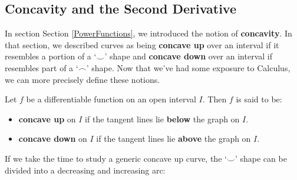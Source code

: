 \subsection{Concavity and the Second Derivative}
\label{concavity}

In section Section \ref{PowerFunctions}, we introduced the notion of \textbf{concavity}.  In that section, we described curves as  being  \textbf{concave up} over an interval if it resembles a  portion of a `$\smile$' shape and   \textbf{concave down} over an interval if resembles part of a `$\frown$' shape. Now that we've had some exposure to Calculus, we can more precisely define these notions.

\medskip


\colorbox{ResultColor}{\bbm

\begin{defn}  \label{concavitydefn} Let $f$ be a differentiable function on an open interval  $I$.  Then $f$ is said to be:

\begin{itemize}

\item  \textbf{concave up} on $I$ if the tangent lines lie \textbf{below} the graph on $I$.

\item  \textbf{concave down} on $I$ if the tangent lines lie \textbf{above} the graph on $I$.

\smallskip

\end{itemize}

\end{defn}

\ebm}

\pagebreak

If we take the time to study a generic concave up curve, the `$\smile$' shape can be divided into a decreasing and increasing arc:

